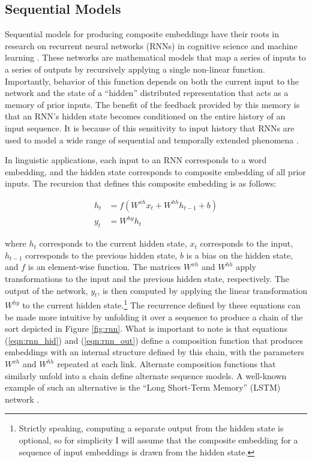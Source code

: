 \subsection{Sequential Models}

Sequential models for producing composite embeddings have their roots in research on recurrent neural networks (RNNs) in cognitive science and machine learning \citep{Elman:1990,Elman:1991}. These networks are mathematical models that map a series of inputs to a series of outputs by recursively applying a single non-linear function. Importantly, behavior of this function depends on both the current input to the network and the state of a ``hidden'' distributed representation that acts as a memory of prior inputs. The benefit of the feedback provided by this memory is that an RNN's hidden state becomes conditioned on the entire history of an input sequence. It is because of this sensitivity to input history that RNNs are used to model a wide range of sequential and temporally extended phenomena \citep{Sutskever:2014}. 

In linguistic applications, each input to an RNN corresponds to a word embedding, and the hidden state corresponds to composite embedding of all prior inputs. The recursion that defines this composite embedding is as follows:

\begin{align}
\label{eqn:rnn_hid}
h_t &= f (W^{xh} x_t + W^{hh} h_{t-1} + b) \\ 
\label{eqn:rnn_out}
y_t &= W^{hy} h_t 
\end{align}

\noindent
where $h_t$ corresponds to the current hidden state, $x_t$ corresponds to the input, $h_{t-1}$ corresponds to the previous hidden state, $b$ is a bias on the hidden state, and $f$ is an element-wise function. The matrices $W^{xh}$ and $W^{hh}$ apply transformations to the input and the previous hidden state, respectively. The output of the network, $y_t$, is then computed by applying the linear transformation $W^{hy}$ to the current hidden state.\footnote{Strictly speaking, computing a separate output from the hidden state is optional, so for simplicity I will assume that the composite embedding for a sequence of input embeddings is drawn from the hidden state.} The recurrence defined by these equations can be made more intuitive by unfolding it over a sequence to produce a chain of the sort depicted in Figure \ref{fig:rnn}. What is important to note is that equations (\ref{eqn:rnn_hid}) and (\ref{eqn:rnn_out}) define a composition function that produces embeddings with an internal structure defined by this chain, with the parameters $W^{xh}$ and $W^{hh}$ repeated at each link. Alternate composition functions that similarly unfold into a chain define alternate sequence models. A well-known example of such an alternative is the ``Long Short-Term Memory'' (LSTM) network \citep{Sutskever:2014}. 

